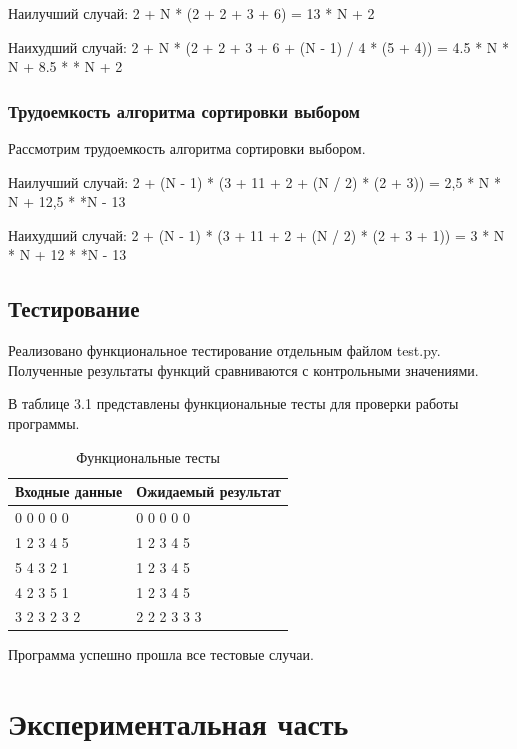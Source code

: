 \documentclass[12pt]{report}
\begin{document}
Наилучший случай: 2 + N * (2 + 2 + 3 + 6) = 13 * N + 2 \vspace{\baselineskip}

Наихудший случай: 2 + N * (2 + 2 + 3 + 6 + (N - 1) / 4 * (5 + 4)) = 4.5 * N * N + 8.5 * * N + 2

\subsection{Трудоемкость алгоритма сортировки выбором}
Рассмотрим трудоемкость алгоритма сортировки выбором.\vspace{\baselineskip} 

Наилучший случай: 2 + (N - 1) * (3 + 11 + 2 + (N / 2) * (2 + 3)) = 2,5 * N * N + 12,5 * *N - 13  

Наихудший случай: 2 + (N - 1) * (3 + 11 + 2 + (N / 2) * (2 + 3 + 1)) = 3 * N * N + 12 * *N - 13

\newpage
\section{Тестирование}
Реализовано функциональное тестирование отдельным файлом test.py. Полученные результаты функций сравниваются с контрольными значениями. \vspace{\baselineskip}

В таблице 3.1 представлены функциональные тесты для проверки работы программы.

\begin{table}[H]
	\caption{\label{tabular:functional_test} Функциональные тесты}
	\begin{center}
		
			\begin{tabular}{ | l | l | }
			\hline
			Входные данные & Ожидаемый результат\\
			\hline
			0 0 0 0 0 & 0 0 0 0 0\\
			1 2 3 4 5 & 1 2 3 4 5 \\
			5 4 3 2 1 & 1 2 3 4 5 \\
			4 2 3 5 1 & 1 2 3 4 5 \\
			3 2 3 2 3 2 & 2 2 2 3 3 3 \\
			\hline
		\end{tabular}
	\end{center}
\end{table} 

Программа успешно прошла все тестовые случаи.

\chapter{Экспериментальная часть}
\end{document}

